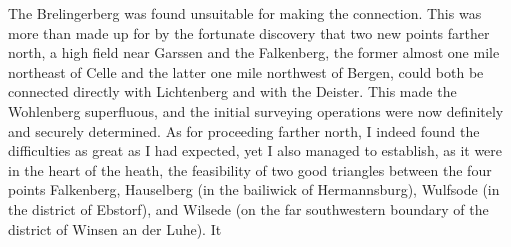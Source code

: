 \par\noindent\hspace*{\parindent}The Brelingerberg was found unsuitable for making the connection. This
was more than made up for by the fortunate discovery that two new points
farther north, a high field near Garssen and the Falkenberg, the former almost
one mile northeast of Celle and the latter one mile northwest of Bergen, could
both be connected directly with Lichtenberg and with the Deister. This made
the Wohlenberg superfluous, and the initial surveying operations were now definitely and
securely determined. As for proceeding farther north, I indeed found the difficulties
as great as I had expected, yet I also managed to establish, as it were in the
heart of the heath, the feasibility of two good triangles between the four
points Falkenberg, Hauselberg (in the bailiwick of Hermannsburg), Wulfsode
(in the district of Ebstorf), and Wilsede (on the far southwestern boundary of
the district of Winsen an der Luhe). It
